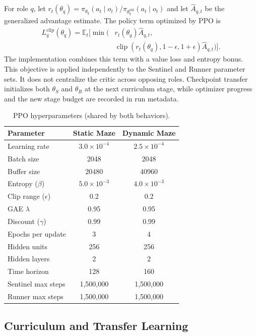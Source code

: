 \documentclass[journal]{IEEEtran}
\begin{document}
For role $q$, let $r_t(\theta_q)=\pi_{\theta_q}(a_t\mid o_t)/\pi_{\theta_q^{\mathrm{old}}}(a_t\mid o_t)$ and let $\widehat{A}_{q,t}$ be the generalized advantage estimate. The policy term optimized by PPO is
\begin{align}
L_q^{\mathrm{clip}}(\theta_q)=\mathbb{E}_t\big[\min\big(&r_t(\theta_q)\widehat{A}_{q,t},\nonumber\\
&\operatorname{clip}(r_t(\theta_q),1-\epsilon,1+\epsilon)\widehat{A}_{q,t}\big)\big].
\end{align}
The implementation combines this term with a value loss and entropy bonus. This objective is applied independently to the Sentinel and Runner parameter sets. It does not centralize the critic across opposing roles. Checkpoint transfer initializes both $\theta_S$ and $\theta_R$ at the next curriculum stage, while optimizer progress and the new stage budget are recorded in run metadata.

\begin{table}[t]
\centering
\caption{PPO hyperparameters (shared by both behaviors).}
\label{tab:hyperparams}
\begin{tabular}{lcc}
\toprule
Parameter & Static Maze & Dynamic Maze \\
\midrule
Learning rate & $3.0{\times}10^{-4}$ & $2.5{\times}10^{-4}$ \\
Batch size & 2048 & 2048 \\
Buffer size & 20480 & 40960 \\
Entropy ($\beta$) & $5.0{\times}10^{-3}$ & $4.0{\times}10^{-3}$ \\
Clip range ($\epsilon$) & 0.2 & 0.2 \\
GAE $\lambda$ & 0.95 & 0.95 \\
Discount ($\gamma$) & 0.99 & 0.99 \\
Epochs per update & 3 & 4 \\
Hidden units & 256 & 256 \\
Hidden layers & 2 & 2 \\
Time horizon & 128 & 160 \\
Sentinel max steps & 1{,}500{,}000 & 1{,}500{,}000 \\
Runner max steps & 1{,}500{,}000 & 1{,}500{,}000 \\
\bottomrule
\end{tabular}
\end{table}

\subsection{Curriculum and Transfer Learning}
\end{document}

